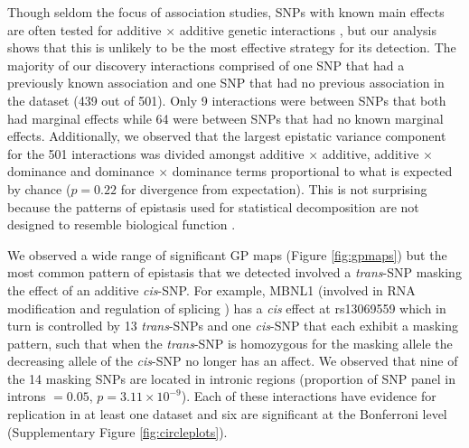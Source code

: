\documentclass{article}
\begin{document}
Though seldom the focus of association studies, SNPs with known main effects are often tested for additive $\times$ additive genetic interactions \cite{Cordell2009}, but our analysis shows that this is unlikely to be the most effective strategy for its detection. The majority of our discovery interactions comprised of one SNP that had a previously known association and one SNP that had no previous association in the dataset \cite{Powell2013} (439 out of 501). Only 9 interactions were between SNPs that both had marginal effects while 64 were between SNPs that had no known marginal effects. Additionally, we observed that the largest epistatic variance component for the 501 interactions was divided amongst additive $\times$ additive, additive $\times$ dominance and dominance $\times$ dominance terms proportional to what is expected by chance ($p = 0.22$ for divergence from expectation). This is not surprising because the patterns of epistasis used for statistical decomposition are not designed to resemble biological function \cite{Cockerham1954}.

We observed a wide range of significant GP maps (Figure \ref{fig:gpmaps}) but the most common pattern of epistasis that we detected involved a \emph{trans}-SNP masking the effect of an additive \emph{cis}-SNP. For example, MBNL1 (involved in RNA modification and regulation of splicing \cite{Ho2004}) has a \emph{cis} effect at rs13069559 which in turn is controlled by 13 \emph{trans}-SNPs and one \emph{cis}-SNP that each exhibit a masking pattern, such that when the \emph{trans}-SNP is homozygous for the masking allele the decreasing allele of the \emph{cis}-SNP no longer has an affect. We observed that nine of the 14 masking SNPs are located in intronic regions (proportion of SNP panel in introns $= 0.05$, $p = 3.11 \times 10^{-9}$). Each of these interactions have evidence for replication in at least one dataset and six are significant at the Bonferroni level (Supplementary Figure \ref{fig:circleplots}).
\end{document}
